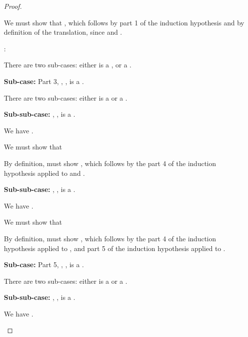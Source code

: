{\begin{proof}
\begin{proofcases}
    We must show that
    \im{\cpstyjudg{\slenv^+}{\sstarty^+}{\sboxty^+}}, which follows by part 1 of the
    induction hypothesis and by definition of the translation, since \im{\sstarty^+ = \cpsstarty}
    and \im{\sboxty^+ = \cpsboxty}.

  \item {}: \im{\styjudg{\slenv}{\spity{\sx}{\seone}{\setwo}}{\sK}}

      There are two sub-cases: either \im{\setwo} is a , or a .
    \item[{\bfseries Sub-case:}] Part 3, \im{\setwo = \sB}, \ie, is a .

      There are two sub-cases: either \im{\seone} is a  or a
      .
    \item[{\bfseries Sub-sub-case:}] \im{\seone = \sA}, \ie, is a .

    We have \im{\styjudg{\slenv}{\spity{\sx}{\sA}{\sB}}{\sstarty}}.

    We must show that \im{\cpstyjudg{\slenv^+}{(\spity{\sx}{\sA}{\sB})^+}{\sstarty^+}}

    By definition, must show
    \im{\cpstyjudg{\slenv^+}{\cpspity{\cpsx}{\sA^\div}{\sB^\div}}{\cpsstarty}}, which follows by the
    part 4 of the induction hypothesis applied to \im{\sA} and \im{\sB}.

    \item[{\bfseries Sub-sub-case:}] \im{\seone = \sK}, \ie, is a .

    We have \im{\styjudg{\slenv}{\spity{\salpha}{\sK}{\sB}}{\sstarty}}.

    We must show that \im{\cpstyjudg{\slenv^+}{(\spity{\salpha}{\sK}{\sB})^+}{\sstarty^+}}

    By definition, must show
    \im{\cpstyjudg{\slenv^+}{\cpspity{\cpsalpha}{\sK^+}{\sB^\div}}{\cpsstarty}}, which follows by the
    part 4 of the induction hypothesis applied to \im{\sB}, and part 5 of the induction hypothesis
    applied to \im{\sK}.

    \item[{\bfseries Sub-case:}] Part 5,  \im{\setwo = \sKpr}, \ie, is a .

    There are two sub-cases: either \im{\seone} is a  or a .
    \item[{\bfseries Sub-sub-case:}] \im{\seone = \sA}, \ie, is a .

    We have \im{\styjudg{\slenv}{\spity{\sx}{\sA}{\sKpr}}{\sU}}.


\end{proofcases}
\end{proof}}
